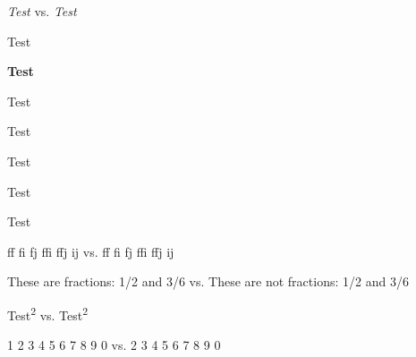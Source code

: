 \documentclass{article}
\begin{document}
   \blinddocument
   
   \textsl{Test} vs. \textit{Test}
   
   {\goldmansansCd Test}

   {\goldmansansCd\bfseries Test}

   {\goldmansansBlk Test}   
   
   {\goldmansansLt Test}   
   
   {\goldmansansTh Test}   

   {\goldmansansSb Test}   
   
   {Test }
   
   ff fi fj ffi ffj ij vs. {ff fi fj ffi ffj ij}
   
   {\goldmansansfrac These are fractions: 1/2 and 3/6} vs. These are not fractions: 1/2 and 3/6
   
   Test\textsuperscript{2} vs. Test\textsuperscript*{2}
   
   1 2 3 4 5 6 7 8 9 0 vs. { 2 3 4 5 6 7 8 9 0}
\end{document}
